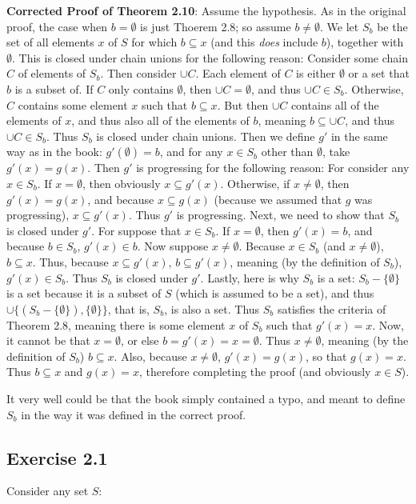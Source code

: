\documentclass{article}
\theoremstyle{definition}
\begin{document}
\textbf{Corrected Proof of Theorem 2.10}:\newline
Assume the hypothesis. As in the original proof, the case when $b=\emptyset$ is just Thoerem 2.8; so assume $b\ne\emptyset$. We let $S_b$ be the set of all 
elements $x$ of $S$ for which $b\subseteq x$ (and this \textit{does} include $b$), together with $\emptyset$. This is closed under chain unions for the following reason: 
Consider some chain $C$ of elements of $S_b$. Then consider $\cup C$. Each element of $C$ is either $\emptyset$ or a set that $b$ is a subset of. If $C$ only contains 
$\emptyset$, then $\cup C=\emptyset$, and thus $\cup C\in S_b$. Otherwise, $C$ contains some element $x$ such that $b\subseteq x$. But then $\cup C$ contains all 
of the elements of $x$, and thus also all of the elements of $b$, meaning $b\subseteq\cup C$, and thus $\cup C\in S_b$. Thus $S_b$ is closed under chain unions. 
Then we define $g'$ in the same way as in the book: $g'(\emptyset)=b$, and for any $x\in S_b$ other than $\emptyset$, take $g'(x)=g(x)$. Then $g'$ is progressing 
for the following reason: For consider any $x\in S_b$. If $x=\emptyset$, then obviously $x\subseteq g'(x)$. Otherwise, if $x\ne\emptyset$, then 
$g'(x)=g(x)$, and because $x\subseteq g(x)$ (because we assumed that $g$ was progressing), $x\subseteq g'(x)$. Thus $g'$ is progressing. Next, we need to show that 
$S_b$ is closed under $g'$. For suppose that $x\in S_b$. If $x=\emptyset$, then $g'(x)=b$, and because $b\in S_b$, $g'(x)\in b$. Now suppose 
$x\ne\emptyset$. Because $x\in S_b$ (and $x\ne\emptyset$), $b\subseteq x$. Thus, because $x\subseteq g'(x)$, $b\subseteq g'(x)$, meaning (by the definition 
of $S_b$), $g'(x)\in S_b$. Thus $S_b$ is closed under $g'$. Lastly, here is why $S_b$ is a set: $S_b-\{\emptyset\}$ is a set because it is a subset of 
$S$ (which is assumed to be a set), and thus $\cup\{(S_b-\{\emptyset\}),\{\emptyset\}\}$, that is, $S_b$, is also a set. Thus $S_b$ satisfies the criteria of 
Theorem 2.8, meaning there is some element $x$ of $S_b$ such that $g'(x)=x$. Now, it cannot be that $x=\emptyset$, or else 
$b=g'(x)=x=\emptyset$. Thus $x\ne\emptyset$, meaning (by the definition of $S_b$) $b\subseteq x$. 
Also, because $x\ne\emptyset$, $g'(x)=g(x)$, so that $g(x)=x$. Thus $b\subseteq x$ and $g(x)=x$, therefore completing the proof (and obviously 
$x\in S$).

It very well could be that the book simply contained a typo, and meant to define $S_b$ in the way it was defined in the correct proof.

\subsection*{Exercise 2.1}
Consider any set $S$:
\end{document}
